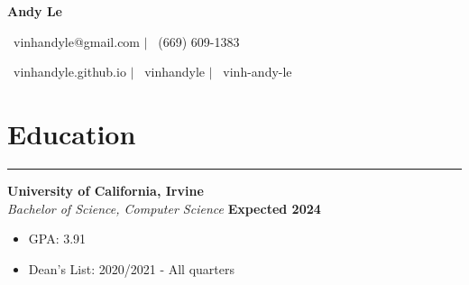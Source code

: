 \documentclass{article}
\begin{document}
   \begin{center}
      \Huge\textbf{Andy Le}\\
      \vspace{3pt}

      \normalsize{\faEnvelope \ vinhandyle@gmail.com} $\vert$
      \normalsize{\faMobile \ (669) 609-1383}\\
      \vspace{3pt}

      \normalsize{\faHome \ vinhandyle.github.io} $\vert$
      \normalsize{\faGithubSquare \ vinhandyle} $\vert$
      \normalsize{\faLinkedinSquare \ vinh-andy-le}
   \end{center}
\vspace{-20pt}

\section*{Education} \vspace{-6pt} \hrule \vspace{6pt}
\textbf{University of California, Irvine} \\
\textit{Bachelor of Science, Computer Science} \hfill \textbf{Expected 2024}
\begin{itemize}
	\item\vspace{-6pt} GPA: 3.91
	\item\vspace{-6pt} Dean's List: 2020/2021 - All quarters
\end{itemize}
\vspace{-20pt}
\end{document}
